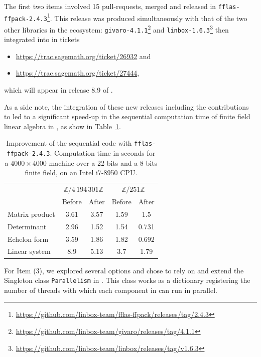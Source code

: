 \documentclass{deliverablereport}
\begin{document}
The first two items involved 15 pull-requests, merged and released in
\texttt{fflas-ffpack-2.4.3}\footnote{\url{https://github.com/linbox-team/fflas-ffpack/releases/tag/2.4.3}}. This release
was produced simultaneously with that of the two other libraries in the \Linbox
ecosystem: \texttt{givaro-4.1.1}\footnote{\url{https://github.com/linbox-team/givaro/releases/tag/4.1.1}} and
\texttt{linbox-1.6.3}\footnote{\url{https://github.com/linbox-team/linbox/releases/tag/v1.6.3}} then integrated into \SageMath
in tickets
\begin{itemize}
\item  \url{https://trac.sagemath.org/ticket/26932} and
\item  \url{https://trac.sagemath.org/ticket/27444},
\end{itemize}
which will appear in release 8.9 of \SageMath.

As a side note, the integration of these new releases including the contributions to  led
to a significant speed-up in the sequential computation time of finite field linear algebra in \SageMath, as show in
Table~\ref{tab:release}.
%
\begin{table}[htb]
  \begin{tabular}{lcccc}
    \toprule
&    \multicolumn{2}{c}{$\mathbb{Z}/4\,194\,301\mathbb{Z}$}&    \multicolumn{2}{c}{$\mathbb{Z}/251\mathbb{Z}$}\\
    & Before & After & Before & After\\
    \midrule
    Matrix product & 3.61& 3.57&1.59&1.5 \\
    Determinant &  2.96& 1.52 &1.54&0.731\\
    Echelon form & 3.59& 1.86 & 1.82& 0.692 \\
    Linear system & 8.9 & 5.13 & 3.7&1.79\\ 
    \bottomrule
  \end{tabular}
  \vspace{1em}
  
  \caption{Improvement of the sequential code with \texttt{fflas-ffpack-2.4.3}. Computation time in seconds for a
    $4000\times    4000$ machine over a 22 bits and a 8 bits finite field, on an Intel i7-8950 CPU.}
  \label{tab:release}
\end{table}

For Item (3), we explored several options and chose to rely on and extend the Singleton class \texttt{Parallelism} in
\SageMath. This class works as a dictionary registering the number of threads with which each component in \SageMath can
run in parallel.
\end{document}
